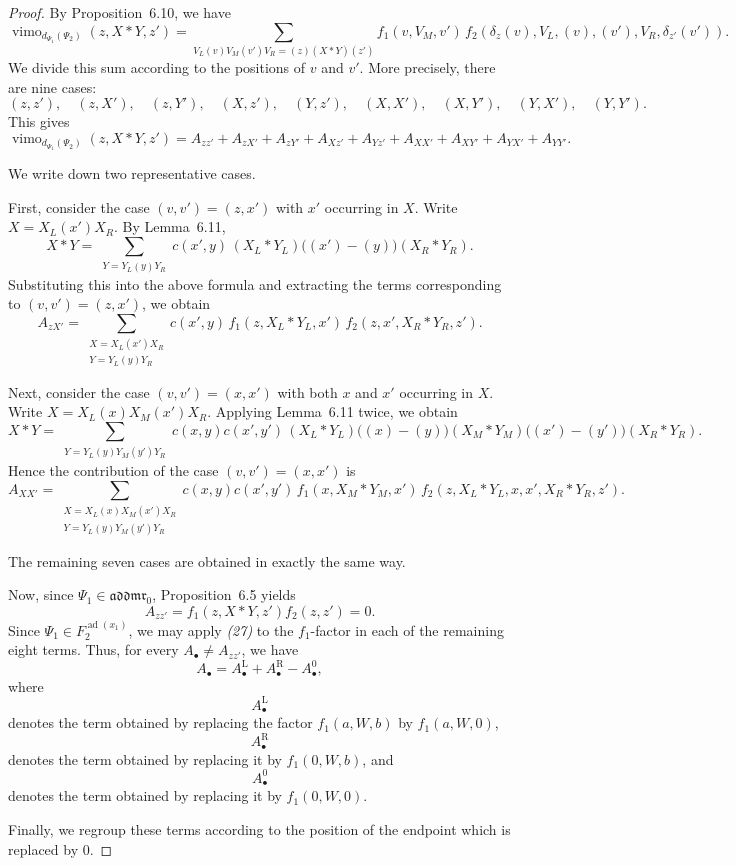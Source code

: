 \documentclass[10pt,a4paper]{amsart}
\newcommand{\addmr}{\mathfrak{addmr}}
\DeclareMathOperator{\vimo}{vimo}
\begin{document}
\begin{proof}
By Proposition~6.10, we have
\[
\vimo_{d_{\Psi_1}(\Psi_2)}(z,X*Y,z')
=
\sum_{V_L(v)V_M(v')V_R=(z)(X*Y)(z')}
f_1(v,V_M,v')\,
f_2(\delta_z(v),V_L,(v),(v'),V_R,\delta_{z'}(v')).
\]
We divide this sum according to the positions of $v$ and $v'$.
More precisely, there are nine cases:
\[
(z,z'),\quad
(z,X'),\quad
(z,Y'),\quad
(X,z'),\quad
(Y,z'),\quad
(X,X'),\quad
(X,Y'),\quad
(Y,X'),\quad
(Y,Y').
\]
This gives
\[
\vimo_{d_{\Psi_1}(\Psi_2)}(z,X*Y,z')
=
A_{zz'}+A_{zX'}+A_{zY'}+A_{Xz'}+A_{Yz'}+A_{XX'}+A_{XY'}+A_{YX'}+A_{YY'}.
\]

We write down two representative cases.

First, consider the case $(v,v')=(z,x')$ with $x'$ occurring in $X$.
Write $X=X_L(x')X_R$.
By Lemma~6.11,
\[
X*Y
=
\sum_{\substack{Y=Y_L(y)Y_R}}
c(x',y)\,(X_L*Y_L)\bigl((x')-(y)\bigr)(X_R*Y_R).
\]
Substituting this into the above formula and extracting the terms
corresponding to $(v,v')=(z,x')$, we obtain
\[
A_{zX'}
=
\sum_{\substack{X=X_L(x')X_R\\ Y=Y_L(y)Y_R}}
c(x',y)\,
f_1(z,X_L*Y_L,x')\,f_2(z,x',X_R*Y_R,z').
\]

Next, consider the case $(v,v')=(x,x')$ with both $x$ and $x'$ occurring in $X$.
Write $X=X_L(x)X_M(x')X_R$.
Applying Lemma~6.11 twice, we obtain
\[
X*Y
=
\sum_{\substack{Y=Y_L(y)Y_M(y')Y_R}}
c(x,y)c(x',y')\,
(X_L*Y_L)\bigl((x)-(y)\bigr)(X_M*Y_M)\bigl((x')-(y')\bigr)(X_R*Y_R).
\]
Hence the contribution of the case $(v,v')=(x,x')$ is
\[
A_{XX'}
=
\sum_{\substack{X=X_L(x)X_M(x')X_R\\ Y=Y_L(y)Y_M(y')Y_R}}
c(x,y)c(x',y')\,
f_1(x,X_M*Y_M,x')\,f_2(z,X_L*Y_L,x,x',X_R*Y_R,z').
\]

The remaining seven cases are obtained in exactly the same way.

Now, since $\Psi_1 \in \addmr_0$, Proposition~6.5 yields
\[
A_{zz'}=f_1(z,X*Y,z')f_2(z,z')=0.
\]
Since $\Psi_1 \in F_2^{\operatorname{ad}(x_1)}$, we may apply \emph{(27)} to the
$f_1$-factor in each of the remaining eight terms.
Thus, for every $A_{\bullet}\neq A_{zz'}$, we have
\[
A_{\bullet}=A_{\bullet}^{\mathrm{L}}+A_{\bullet}^{\mathrm{R}}-A_{\bullet}^{0},
\]
where
\[
A_{\bullet}^{\mathrm{L}}
\]
denotes the term obtained by replacing the factor
$f_1(a,W,b)$ by $f_1(a,W,0)$,
\[
A_{\bullet}^{\mathrm{R}}
\]
denotes the term obtained by replacing it by $f_1(0,W,b)$,
and
\[
A_{\bullet}^{0}
\]
denotes the term obtained by replacing it by $f_1(0,W,0)$.

Finally, we regroup these terms according to the position of the endpoint
which is replaced by $0$.


\end{proof}
\end{document}
